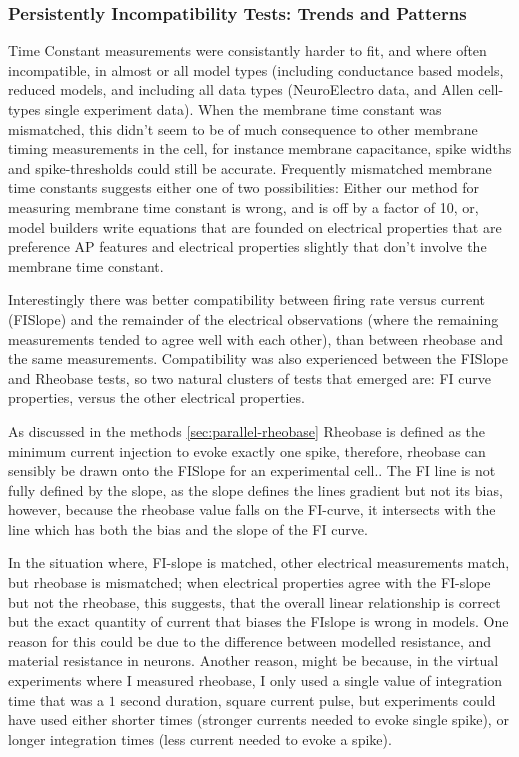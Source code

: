 

\subsubsection{Persistently Incompatibility Tests: Trends and Patterns}



Time Constant measurements were consistantly harder to fit, and where often incompatible, in almost or all model types (including conductance based models, reduced models, and including all data types (NeuroElectro data, and Allen cell-types single experiment data). When the membrane time constant was mismatched, this didn't seem to be of much consequence to other membrane timing measurements in the cell, for instance membrane capacitance, spike widths and spike-thresholds could still be accurate. Frequently mismatched membrane time constants suggests either one of two possibilities: Either our method for measuring membrane time constant is wrong, and is off by a factor of 10, or, model builders write equations that are founded on electrical properties that are preference AP features and electrical properties slightly that don't involve the membrane time constant.

Interestingly there was better compatibility between firing rate versus current (FISlope) and the remainder of the electrical observations (where the remaining measurements tended to agree well with each other), than between rheobase and the same measurements. Compatibility was also experienced between the FISlope and Rheobase tests, so two natural clusters of tests that emerged are: FI curve properties, versus the other electrical properties.

As discussed in the methods \ref{sec:parallel-rheobase} Rheobase is defined as the minimum current injection to evoke exactly one spike, therefore, rheobase can sensibly be drawn onto the FISlope for an experimental cell.. The FI line is not fully defined by the slope, as the slope defines the lines gradient but not its bias, however, because the rheobase value falls on the FI-curve, it intersects with the line which has both the bias and the slope of the FI curve. 

In the situation where, FI-slope is matched, other electrical measurements match, but rheobase is mismatched; when electrical properties agree with the FI-slope but not the rheobase, this suggests, that the overall linear relationship is correct but the exact quantity of current that biases the FIslope is wrong in models. One reason for this could be due to the difference between modelled resistance, and material resistance in neurons. Another reason, might be because, in the virtual experiments where I measured rheobase, I only used a single value of integration time that was a $1$ second duration,  square current pulse, but experiments could have used either shorter times (stronger currents needed to evoke single spike), or longer integration times (less current needed to evoke a spike).


